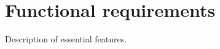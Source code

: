 
\section{Functional requirements}\label{sec:functional-requirements}
{\color{gray} Description of essential features.}